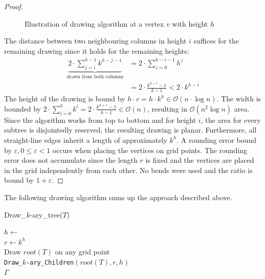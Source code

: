\begin{proof}
\begin{figure}[H]
\begin{subfigure}{\textwidth}
		\end{subfigure}
	\caption{Illustration of drawing algorithm at a vertex $v$ with height $h$}\label{im:k-ary_trees_algorithm_illustration}
\end{figure}
	The distance between two neighbouring columns in height $i$ suffices for the remaining drawing since it holds for the remaining heights:
	\begin{align}
		\underbrace{2\cdot \sum_{j=i}^{h-1} k^{h-j-1}}_{\text{drawn from both columns}} &= 2\cdot\sum_{z = 0}^{h-i-1}h^z\\
		&= 2\cdot\frac{k^{h-i}-1}{k-1} < 2\cdot k^{h-i}
	\end{align}
	The height of the drawing is bound by $h\cdot r = h\cdot k^h \in \mathcal{O}(n\cdot \log n)$. The width is bounded by $2\cdot\sum_{i = 0}^{h} k^i = 2\cdot \frac{k^{h+1}-1}{k-1} \in \mathcal{O}(n)$, resulting in $\mathcal{O}(n^2\log n)$ area.\\ 
	Since the algorithm works from top to bottom and for height $i$, the area for every subtree is disjointedly reserved, the resulting drawing is planar. Furthermore, all straight-line edges inherit a length of approximately $k^h$. A rounding error bound by $\varepsilon, 0\leq \varepsilon<1$ occurs when placing the vertices on grid points. The rounding error does not accumulate since the length $r$ is fixed and the vertices are placed in the grid independently from each other. No bends were used and the ratio is bound by $1+\varepsilon$.
\end{proof}
\bigskip
The following drawing algorithm sums up the approach described above.\\
\begin{algorithm}[H]
	\caption{Draw\_$k$-ary\_tree($T$)}\label{al:complete_k-ary_tree}
	$h \gets $ \\
	$r \gets k^h$\\
	Draw $root(T)$ on any grid point\\
	\texttt{Draw\_$k$-ary\_Children}$(root(T),r,h)$\\
	\Return $\Gamma$
\end{algorithm}
